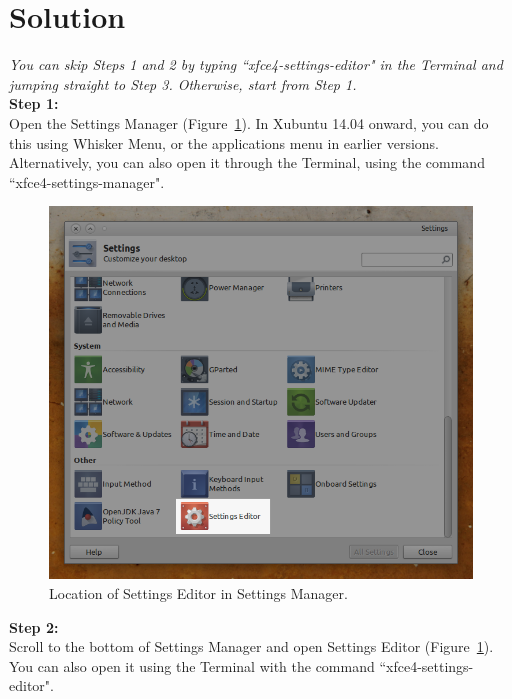 \documentclass[12pt, a4paper]{article}
\begin{document}
\section*{Solution}

\emph{You can skip Steps 1 and 2 by typing ``xfce4-settings-editor" in the Terminal and jumping straight to Step 3. Otherwise, start from Step 1.}\\

\noindent \textbf{Step 1:}\\

\noindent Open the Settings Manager (Figure~\ref{fig3}). In Xubuntu 14.04 onward, you can do this using Whisker Menu, or the applications menu in earlier versions. Alternatively, you can also open it through the Terminal, using the command ``xfce4-settings-manager".

\begin{figure}[h]
  \centering
  \includegraphics[width=1\textwidth]{imgs/3settingsmanager.png}
  \caption{Location of Settings Editor in Settings Manager.}
  \label{fig3}
\end{figure}

\newpage
\noindent \textbf{Step 2:}\\

\noindent Scroll to the bottom of Settings Manager and open Settings Editor (Figure~\ref{fig3}). You can also open it using the Terminal with the command ``xfce4-settings-editor".\\
\end{document}
